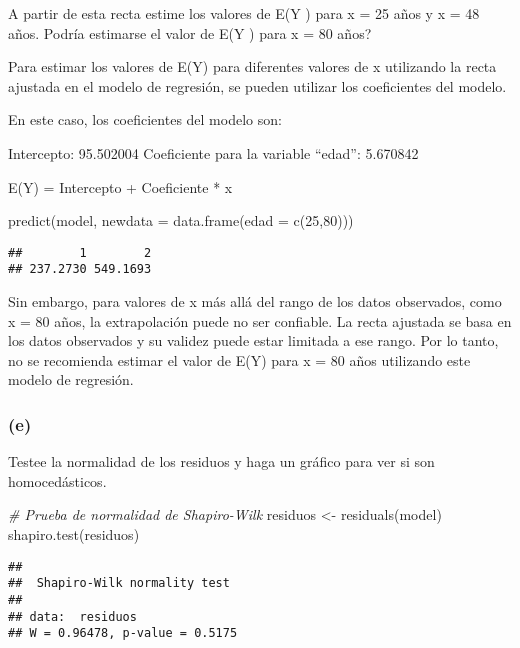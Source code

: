 \documentclass[
]{article}
\newenvironment{Shaded}{\begin{snugshade}}{\end{snugshade}}
\newcommand{\AttributeTok}[1]{\textcolor[rgb]{0.77,0.63,0.00}{#1}}
\newcommand{\CommentTok}[1]{\textcolor[rgb]{0.56,0.35,0.01}{\textit{#1}}}
\newcommand{\DecValTok}[1]{\textcolor[rgb]{0.00,0.00,0.81}{#1}}
\newcommand{\FunctionTok}[1]{\textcolor[rgb]{0.00,0.00,0.00}{#1}}
\newcommand{\NormalTok}[1]{#1}
\newcommand{\OtherTok}[1]{\textcolor[rgb]{0.56,0.35,0.01}{#1}}
\begin{document}
A partir de esta recta estime los valores de E(Y ) para x = 25 años y x
= 48 años. Podría estimarse el valor de E(Y ) para x = 80 años?

Para estimar los valores de E(Y) para diferentes valores de x utilizando
la recta ajustada en el modelo de regresión, se pueden utilizar los
coeficientes del modelo.

En este caso, los coeficientes del modelo son:

Intercepto: 95.502004 Coeficiente para la variable ``edad'': 5.670842

E(Y) = Intercepto + Coeficiente * x

\begin{Shaded}
\begin{Highlighting}[]
\FunctionTok{predict}\NormalTok{(model, }\AttributeTok{newdata =} \FunctionTok{data.frame}\NormalTok{(}\AttributeTok{edad =} \FunctionTok{c}\NormalTok{(}\DecValTok{25}\NormalTok{,}\DecValTok{80}\NormalTok{)))}
\end{Highlighting}
\end{Shaded}

\begin{verbatim}
##        1        2 
## 237.2730 549.1693
\end{verbatim}

{Sin embargo, para valores de x más allá del rango de los datos
observados, como x = 80 años, la extrapolación puede no ser confiable.
La recta ajustada se basa en los datos observados y su validez puede
estar limitada a ese rango. Por lo tanto, no se recomienda estimar el
valor de E(Y) para x = 80 años utilizando este modelo de regresión.}

\hypertarget{e-1}{%
\subsubsection{(e)}\label{e-1}}

Testee la normalidad de los residuos y haga un gráfico para ver si son
homocedásticos.

\begin{Shaded}
\begin{Highlighting}[]
\CommentTok{\# Prueba de normalidad de Shapiro{-}Wilk }
\NormalTok{residuos }\OtherTok{\textless{}{-}} \FunctionTok{residuals}\NormalTok{(model)}
\FunctionTok{shapiro.test}\NormalTok{(residuos)}
\end{Highlighting}
\end{Shaded}

\begin{verbatim}
## 
##  Shapiro-Wilk normality test
## 
## data:  residuos
## W = 0.96478, p-value = 0.5175
\end{verbatim}
\end{document}
